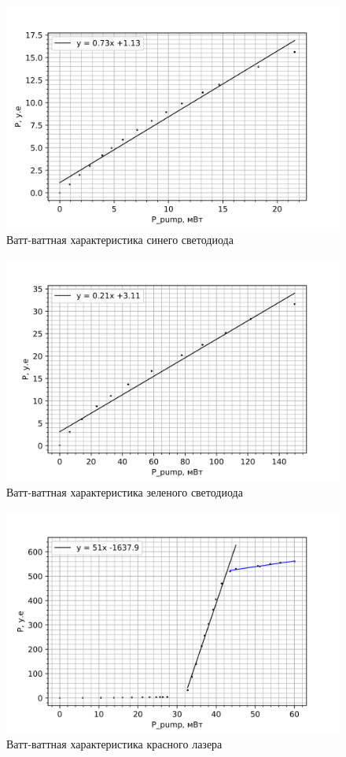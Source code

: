 \documentclass[a4paper,12pt]{report}
\begin{document}
\begin{figure}[H]
	\centering
	\includegraphics[scale=0.7]{Blue_phdiod_1.png}
	\caption{Ватт-ваттная характеристика синего светодиода}
        \label{pic.2}
\end{figure}

\begin{figure}[H]
	\centering
	\includegraphics[scale=0.7]{Green_phdiod_1.png}
	\caption{Ватт-ваттная характеристика зеленого светодиода}
        \label{pic.3}
\end{figure}

\begin{figure}[H]
	\centering
	\includegraphics[scale=0.7]{Red_lazer_1.png}
	\caption{Ватт-ваттная характеристика красного лазера}
        \label{pic.4}
\end{figure}
\end{document}
